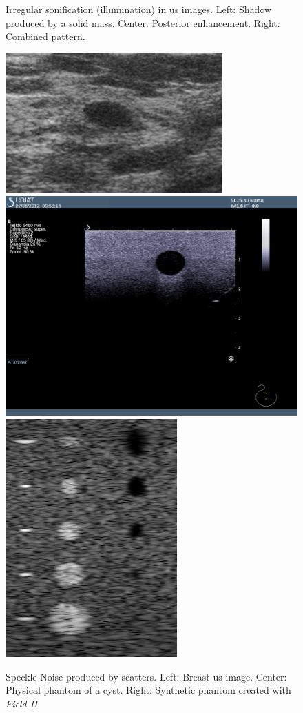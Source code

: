 \begin{frame}
\begin{overprint}
\begin{figure}
		\caption{Irregular sonification (illumination) in \ac{us} images. Left: Shadow produced by a solid mass. Center: Posterior enhancement. Right: Combined pattern. }
		\end{figure}	

		\vspace{15pt}
		\begin{figure} 
		\includegraphics[trim = 0 0 25 0, clip,height=.31\textwidth]{speckle/005.png}\hspace{.5pt}
\includegraphics[trim = 480 350 400 165, clip,height=.31\textwidth]{speckle/physicPhantom.png}\hspace{.5pt}
\includegraphics[height=.31\textwidth]{speckle/cyst_sim.png}
		\caption{Speckle Noise produced by scatters. Left: Breast \ac{us} image. Center: Physical phantom of a cyst. Right: Synthetic phantom created with \emph{Field II}}
		\end{figure}	
\end{overprint}
\end{frame}



